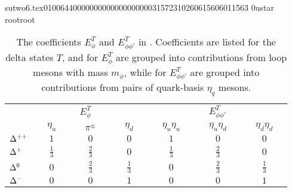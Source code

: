                                                                                                                                                                                                                                                                                       sutwo6.tex                                                                                          0100644 0000000 0000000 00000315723 10260615606 011563  0                                                                                                    ustar   root                            root                                                                                                                                                                                                                   \documentclass[prd,amssymb,amsmath,showpacs,nofootinbib,superscriptaddress]{revtex4}
\begin{document}
\begin{table}[ht]
\caption{The coefficients $E^T_\phi$ and $E^T_{\phi\phi'}$ in \PQCPT. Coefficients are
listed for the delta states $T$, and for $E^T_\phi$ are grouped into contributions from loop mesons
with mass $m_\phi$, while for $E^T_{\phi\phi'}$ are grouped into contributions from pairs of quark-basis 
$\eta_q$ mesons.}
\begin{tabular}{l | c c c | c  c c}
& \multicolumn{3}{c|}{$E^T_\phi \phantom{ap}$} & \multicolumn{3}{c}{$E^T_{\phi\phi'}$ \phantom{sp}} \\
      & $\quad \eta_u \quad$ & $\quad \pi^\pm \quad $ & $\quad \eta_d \quad $  & $\quad \eta_u \eta_u \quad$ & $\quad \eta_u \eta_d \quad $& $\quad \eta_d \eta_d \quad$ \\
\hline
${\Delta}^{++}$       
           &  $1$ & $0$  & $0$ 
           & $1$  & $0$  & $0$ \\

${\Delta}^+$ 
           &  $\frac{1}{3}$ & $\frac{2}{3}$  & $0$ 
           &  $\frac{1}{3}$ & $\frac{2}{3}$  & $0$ \\

${\Delta}^0$    
           &  $0$ & $\frac{2}{3}$  & $\frac{1}{3}$ 
           &  $0$ & $\frac{2}{3}$  & $\frac{1}{3}$ \\

${\Delta}^-$ 
           &  $0$ & $0$  & $1$ 
           &  $0$ & $0$ & $1$ 
\end{tabular}
\label{t:PQQCD-E}
\end{table}
\end{document}

